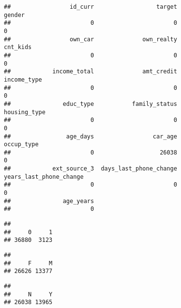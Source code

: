 \documentclass[
]{article}
\newenvironment{Shaded}{\begin{snugshade}}{\end{snugshade}}
\newcommand{\FunctionTok}[1]{\textcolor[rgb]{0.00,0.00,0.00}{#1}}
\newcommand{\NormalTok}[1]{#1}
\newcommand{\SpecialCharTok}[1]{\textcolor[rgb]{0.00,0.00,0.00}{#1}}
\begin{document}
\begin{verbatim}
##                 id_curr                  target                  gender 
##                       0                       0                       0 
##                 own_car              own_realty                cnt_kids 
##                       0                       0                       0 
##            income_total              amt_credit             income_type 
##                       0                       0                       0 
##               educ_type           family_status            housing_type 
##                       0                       0                       0 
##                age_days                 car_age              occup_type 
##                       0                   26038                       0 
##            ext_source_3  days_last_phone_change years_last_phone_change 
##                       0                       0                       0 
##               age_years 
##                       0
\end{verbatim}

\begin{Shaded}
\end{Shaded}

\begin{verbatim}
## 
##     0     1 
## 36880  3123
\end{verbatim}

\begin{Shaded}
\end{Shaded}

\begin{verbatim}
## 
##     F     M 
## 26626 13377
\end{verbatim}

\begin{Shaded}
\end{Shaded}

\begin{verbatim}
## 
##     N     Y 
## 26038 13965
\end{verbatim}
\end{document}

